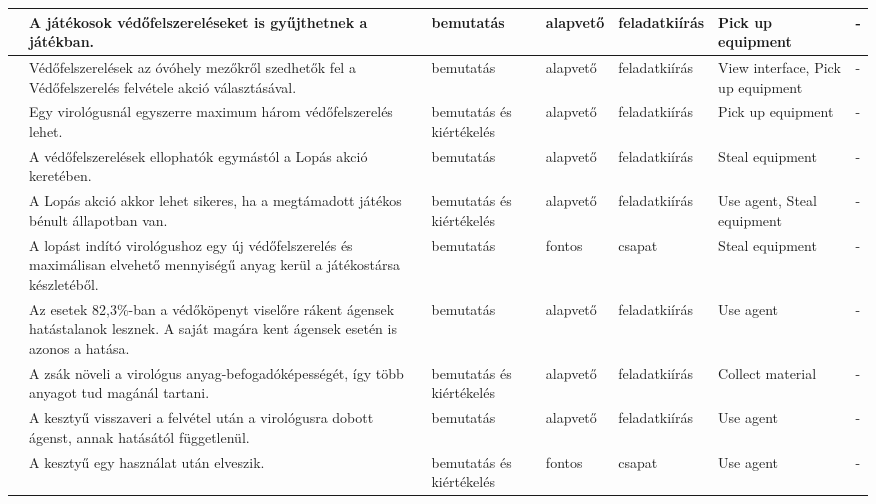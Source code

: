 \begin{xltabular}{\textwidth}{| X | p{4cm} | p{2cm} | p{1.8cm} | p{1.3cm} | p{2cm} | X |}
	\azonosito &
	A játékosok védőfelszereléseket is gyűjthetnek a játékban. &
	bemutatás &
	alapvető &
	feladatkiírás &
	Pick up equipment &
	- \\
	\hline

	\azonosito &
	Védőfelszerelések az óvóhely mezőkről szedhetők fel a Védőfelszerelés felvétele akció választásával. &
	bemutatás &
	alapvető &
	feladatkiírás &
	View interface, Pick up equipment &
	- \\
	\hline

	\azonosito &
	Egy virológusnál egyszerre maximum három védőfelszerelés lehet. &
	bemutatás és kiértékelés &
	alapvető &
	feladatkiírás &
	Pick up equipment &
	- \\
	\hline

	\azonosito &
	A védőfelszerelések ellophatók egymástól a Lopás akció keretében. &
	bemutatás &
	alapvető &
	feladatkiírás &
	Steal equipment &
	- \\
	\hline

	\azonosito &
	A Lopás akció akkor lehet sikeres, ha a megtámadott játékos bénult állapotban van. &
	bemutatás és kiértékelés &
	alapvető &
	feladatkiírás &
	Use agent, Steal equipment &
	- \\
	\hline

	\azonosito &
	A lopást indító virológushoz egy új védőfelszerelés és maximálisan elvehető mennyiségű anyag kerül a játékostársa készletéből. &
	bemutatás &
	fontos &
	csapat &
	Steal equipment &
	- \\
	\hline

	\azonosito &
	Az esetek 82,3\%-ban a védőköpenyt viselőre rákent ágensek hatástalanok lesznek. A saját magára kent ágensek esetén is azonos a hatása. &
	bemutatás &
	alapvető &
	feladatkiírás &
	Use agent &
	- \\
	\hline

	\azonosito &
	A zsák  növeli a virológus anyag-befogadóképességét, így több anyagot tud magánál tartani. &
	bemutatás és kiértékelés &
	alapvető &
	feladatkiírás &
	Collect material &
	- \\
	\hline

	\azonosito &
	A kesztyű visszaveri a felvétel után a virológusra dobott ágenst, annak hatásától függetlenül. &
	bemutatás &
	alapvető &
	feladatkiírás &
	Use agent &
	- \\
	\hline

	\azonosito &
	A kesztyű egy használat után elveszik. &
	bemutatás és kiértékelés &
	fontos &
	csapat &
	Use agent &
	- \\
	\hline


\end{xltabular}
